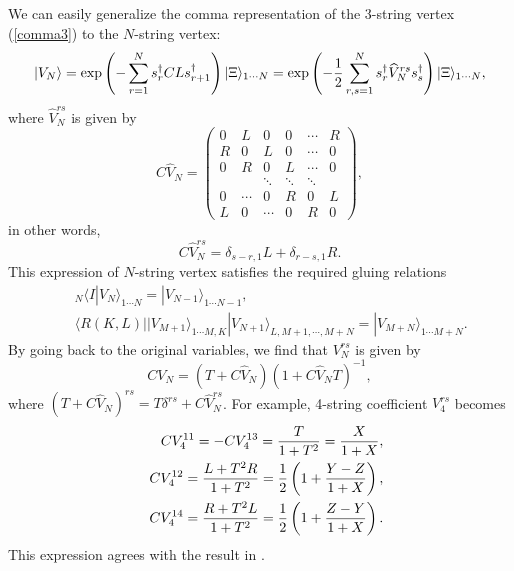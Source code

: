 \documentclass[a4paper,12pt]{article}
\def\cob{\delta}
\def\hf{{1\over 2}}
\def\o{\over}
\def\bra{\langle}
\def\ket{\rangle}
\def\lf{\left}
\def\ri{\right}
\def\h#1{\widehat{#1}}
\def\sd{s^{\dagger}}
\newcommand{\nn}{\nonumber \\}
\begin{document}
We can easily generalize the comma representation of the 3-string vertex 
(\ref{comma3})
to the  $N$-string  vertex:
\begin{equation}
 |V_N\ket=\exp\lf(-\sum_{r=1}^N\sd_rCL\sd_{r+1}\ri)|\Xi\ket_{1\cdots N}=
\exp\lf(-\hf \sum_{r,s=1}^N\sd_r\h{V}^{rs}_N
\sd_s\ri)|\Xi\ket_{1\cdots N},
\end{equation}
where $\h{V}_N^{rs}$ is given by
\begin{equation}
C\h{V}_N=\lf(
\begin{array}{cccccc}
0&L&0&0&\cdots& R\\
R&0&L&0&\cdots&0 \\
0&R&0&L&\cdots&0 \\
 & &\ddots&\ddots &\ddots& \\
0&\cdots&0& R&0&L\\
L&0&\cdots&0&R&0 
\end{array}\ri),
\end{equation}
in other words,
\begin{equation}
C\h{V}^{rs}_N=\cob_{s-r,1}L+\cob_{r-s,1}R.
\end{equation}
This expression of $N$-string vertex satisfies the 
required gluing relations \cite{KawanoOkuyama}
\begin{eqnarray}
&& {}_N\bra I|V_N\ket_{1\cdots N}=|V_{N-1}\ket_{1\cdots N-1}, 
\label{IVN}\\
 &&\bra R(K,L)||V_{M+1}\ket_{1\cdots M,K}|V_{N+1}\ket_{L,M+1,\cdots,M+N}
= |V_{M+N}\ket_{1\cdots M+N}.
\end{eqnarray}
By going back to the original variables, we find that 
$V^{rs}_N$ is given by
\begin{equation}
CV_N=(T+C\h{V}_N)(1+C\h{V}_NT)^{-1} ,
\label{VhatV}
\end{equation}
where $(T+C\h{V}_N)^{rs}=T\cob^{rs}+C\h{V}_N^{rs}$.
For example, 4-string coefficient $V_4^{rs}$ becomes
\begin{eqnarray}
&&CV_4^{11}=-CV^{13}_4={T\o 1+T^2}={X\o 1+X}, \nn
&&CV_4^{12}={L+T^2R\o 1+T^2}=\hf\lf(1+{Y-Z\o 1+X}\ri), \\ 
&&CV_4^{14}={R+T^2L\o 1+T^2}=\hf\lf(1+{Z-Y\o 1+X}\ri). \nonumber
\end{eqnarray}
This expression agrees with the result in \cite{GrossJevicki}. 
\end{document}
